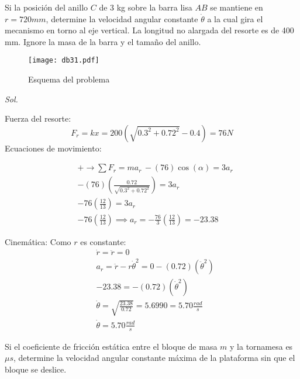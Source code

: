 \begin{example}
    Si la posición del anillo $C$ de 3 kg sobre la barra lisa $AB$ se mantiene en $r= 720 mm$, determine la velocidad angular constante $\dot{\theta}$ a la cual gira el mecanismo en torno al eje vertical. La longitud no alargada del resorte es de 400 mm. Ignore la masa de la barra y el tamaño del anillo.
\end{example}
\begin{figure}[h!]
\centering
  \texttt{[image: db31.pdf]}
  \caption{Esquema del problema}
  \label{db31}
\end{figure}
\textit{ Sol. }

Fuerza del resorte:
\begin{equation*}
    F_r = kx = 200\left(\sqrt{0.3^2 + 0.72^2} - 0.4\right) = 76N
\end{equation*}
Ecuaciones de movimiento:

\begin{align*}
    &+\rightarrow \sum F_r = ma_r\, -(76)\cos{(\alpha)} = 3a_r\\
    &-(76)\left(\frac{0.72}{\sqrt{0.3^2 + 0.72^2}}\right) = 3a_r\\
    &- 76\left(\frac{12}{13}\right) = 3a_r\\
    &-76\left( \frac{12}{13} \right)\implies a_r =-\frac{76}{3} \left(\frac{12}{13}\right) =- 23.38
\end{align*}

Cinemática: Como $r$ es constante:
\begin{align*}
    &\dot{r}=\ddot{r}=0\\ 
    &a_r =\ddot{r} - r\dot{\theta}^2 = 0 -(0.72)(\ddot{\theta}^2)\\
    &- 23.38 =-(0.72)(\dot{\theta}^2)\\
    &\dot{\theta} = \sqrt{\frac{23.38}{0.72}} = 5.6990 = 5.70\frac{rad}{s}\\
    &\dot{\theta} = 5.70 \frac{rad}{s}
\end{align*}

\begin{example}
    Si el coeficiente de fricción estática entre el bloque de masa $m$ y la tornamesa es $\mu s$, determine la velocidad angular constante máxima de la plataforma sin que el bloque se deslice.
\end{example}

